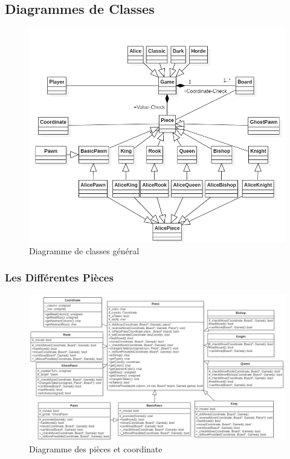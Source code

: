 \documentclass[10pt, a4paper]{article}
\begin{document}
\subsection{Diagrammes de Classes}
\begin{figure}[H]
\centering
\includegraphics[scale=0.5]{ClassDiagram.png}
\caption{Diagramme de classes général}
\label{CD} %
\end{figure}

\subsubsection{Les Différentes Pièces}
\begin{figure}[H]
\centering
\includegraphics[scale=0.5]{pieces_diagram.png}
\caption{Diagramme des pièces et coordinate}
\label{CD} %
\end{figure}
\end{document}
